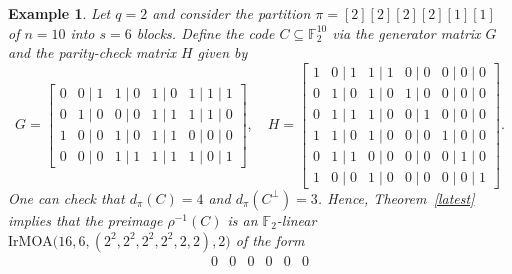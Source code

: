 \documentclass[11pt]{article}
\newtheorem{Example}[Theorem]{Example}
\newtheorem{Definition and Notation}[Theorem]{Definition and Notation}
\begin{document}
\begin{Example}
Let $q=2$ and consider the partition $\pi=[2][2][2][2][1][1]$ of $n=10$ into $s=6$ blocks. Define the code $C\subseteq \mathbb{F}_2^{10}$ via the generator matrix $G$ and the parity-check matrix $H$ given by
$$
G=
\begin{bmatrix}
0&0 \mid 1&1 \mid 0&1 \mid 0&1 \mid 1 \mid 1\\
0&1 \mid 0&0 \mid 0&1 \mid 1&1 \mid 1 \mid 0\\
1&0 \mid 0&1 \mid 0&1 \mid 1&0 \mid 0 \mid 0\\
0&0 \mid 0&1 \mid 1&1 \mid 1&1 \mid 0 \mid 1
\end{bmatrix},\quad
H=
\begin{bmatrix}
1&0 \mid 1&1 \mid 1&0 \mid 0&0 \mid 0 \mid 0\\
0&1 \mid 0&1 \mid 0&1 \mid 0&0 \mid 0 \mid 0\\
0&1 \mid 1&1 \mid 0&0 \mid 1&0 \mid 0 \mid 0\\
1&1 \mid 0&1 \mid 0&0 \mid 0&1 \mid 0 \mid 0\\
0&1 \mid 1&0 \mid 0&0 \mid 0&0 \mid 1 \mid 0\\
1&0 \mid 0&1 \mid 0&0 \mid 0&0 \mid 0 \mid 1
\end{bmatrix}.
$$
One can check that $d_\pi(C)=4$ and $d_\pi(C^\perp)=3$. Hence, Theorem~\ref{latest} implies that the preimage $\rho^{-1}(C)$ is an $\mathbb{F}_2$-linear $\mathrm{IrMOA}\bigl(16,6,(2^2,2^2,2^2,2^2,2,2),2\bigr)$ of the form 
$$
\begin{array}{cccccc}
0 & 0 & 0 & 0 & 0 & 0\\

\end{array}$$
\end{Example}
\end{document}
